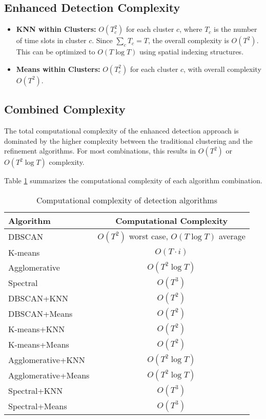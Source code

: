\subsection{Enhanced Detection Complexity}

\begin{itemize}
    \item \textbf{KNN within Clusters:} $O(T_c^2)$ for each cluster $c$, where $T_c$ is the number of time slots in cluster $c$. Since $\sum_c T_c = T$, the overall complexity is $O(T^2)$. This can be optimized to $O(T \log T)$ using spatial indexing structures.
    
    \item \textbf{Means within Clusters:} $O(T_c^2)$ for each cluster $c$, with overall complexity $O(T^2)$.
\end{itemize}

\subsection{Combined Complexity}

The total computational complexity of the enhanced detection approach is dominated by the higher complexity between the traditional clustering and the refinement algorithms. For most combinations, this results in $O(T^2)$ or $O(T^2 \log T)$ complexity.

Table \ref{tab:complexity_comparison} summarizes the computational complexity of each algorithm combination.

\begin{table}[htbp]
    \centering
    \caption{Computational complexity of detection algorithms}
    \label{tab:complexity_comparison}
    \begin{tabular}{lc}
        \toprule
        \textbf{Algorithm} & \textbf{Computational Complexity} \\
        \midrule
        DBSCAN & $O(T^2)$ worst case, $O(T \log T)$ average \\
        K-means & $O(T \cdot i)$ \\
        Agglomerative & $O(T^2 \log T)$ \\
        Spectral & $O(T^3)$ \\
        DBSCAN+KNN & $O(T^2)$ \\
        DBSCAN+Means & $O(T^2)$ \\
        K-means+KNN & $O(T^2)$ \\
        K-means+Means & $O(T^2)$ \\
        Agglomerative+KNN & $O(T^2 \log T)$ \\
        Agglomerative+Means & $O(T^2 \log T)$ \\
        Spectral+KNN & $O(T^3)$ \\
        Spectral+Means & $O(T^3)$ \\
        \bottomrule
    \end{tabular}
\end{table}

